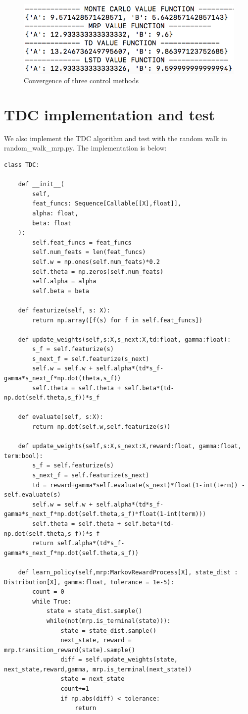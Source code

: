 \documentclass{article}[12pt]
\begin{document}
 \begin{figure}[h]
  \includegraphics[width=0.5\linewidth]{various.png}
  \caption{Convergence of three control methods}
  \label{fig:optPol1}
\end{figure}


\section{TDC implementation and test}
We also implement the TDC algorithm and test with the random walk in random\_walk\_mrp.py. The implementation is below:

\begin{lstlisting}
class TDC:

    def __init__(
        self,
        feat_funcs: Sequence[Callable[[X],float]],
        alpha: float,
        beta: float
    ):
        self.feat_funcs = feat_funcs
        self.num_feats = len(feat_funcs)
        self.w = np.ones(self.num_feats)*0.2
        self.theta = np.zeros(self.num_feats)
        self.alpha = alpha
        self.beta = beta

    def featurize(self, s: X):
        return np.array([f(s) for f in self.feat_funcs])

    def update_weights(self,s:X,s_next:X,td:float, gamma:float):
        s_f = self.featurize(s)
        s_next_f = self.featurize(s_next)
        self.w = self.w + self.alpha*(td*s_f-gamma*s_next_f*np.dot(theta,s_f))
        self.theta = self.theta + self.beta*(td-np.dot(self.theta,s_f))*s_f

    def evaluate(self, s:X):
        return np.dot(self.w,self.featurize(s))

    def update_weights(self,s:X,s_next:X,reward:float, gamma:float, term:bool):
        s_f = self.featurize(s)
        s_next_f = self.featurize(s_next)
        td = reward+gamma*self.evaluate(s_next)*float(1-int(term)) - self.evaluate(s)
        self.w = self.w + self.alpha*(td*s_f-gamma*s_next_f*np.dot(self.theta,s_f)*float(1-int(term)))
        self.theta = self.theta + self.beta*(td-np.dot(self.theta,s_f))*s_f
        return self.alpha*(td*s_f-gamma*s_next_f*np.dot(self.theta,s_f))
     
    def learn_policy(self,mrp:MarkovRewardProcess[X], state_dist : Distribution[X], gamma:float, tolerance = 1e-5):
        count = 0
        while True:
            state = state_dist.sample()
            while(not(mrp.is_terminal(state))):
                state = state_dist.sample()
                next_state, reward = mrp.transition_reward(state).sample()
                diff = self.update_weights(state, next_state,reward,gamma, mrp.is_terminal(next_state))
                state = next_state
                count+=1
                if np.abs(diff) < tolerance:
                    return
\end{lstlisting}
\end{document}
